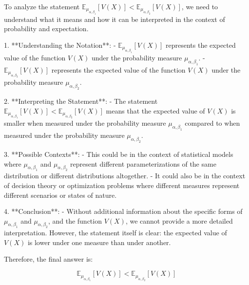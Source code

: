 To analyze the statement \(\mathbb{E}_{\mu_{\alpha, \beta_1}} [V(X)] < \mathbb{E}_{\mu_{\alpha, \beta_2}} [V(X)]\), we need to understand what it means and how it can be interpreted in the context of probability and expectation.

1. **Understanding the Notation**:
   - \(\mathbb{E}_{\mu_{\alpha, \beta_1}} [V(X)]\) represents the expected value of the function \(V(X)\) under the probability measure \(\mu_{\alpha, \beta_1}\).
   - \(\mathbb{E}_{\mu_{\alpha, \beta_2}} [V(X)]\) represents the expected value of the function \(V(X)\) under the probability measure \(\mu_{\alpha, \beta_2}\).

2. **Interpreting the Statement**:
   - The statement \(\mathbb{E}_{\mu_{\alpha, \beta_1}} [V(X)] < \mathbb{E}_{\mu_{\alpha, \beta_2}} [V(X)]\) means that the expected value of \(V(X)\) is smaller when measured under the probability measure \(\mu_{\alpha, \beta_1}\) compared to when measured under the probability measure \(\mu_{\alpha, \beta_2}\).

3. **Possible Contexts**:
   - This could be in the context of statistical models where \(\mu_{\alpha, \beta_1}\) and \(\mu_{\alpha, \beta_2}\) represent different parameterizations of the same distribution or different distributions altogether.
   - It could also be in the context of decision theory or optimization problems where different measures represent different scenarios or states of nature.

4. **Conclusion**:
   - Without additional information about the specific forms of \(\mu_{\alpha, \beta_1}\) and \(\mu_{\alpha, \beta_2}\), and the function \(V(X)\), we cannot provide a more detailed interpretation. However, the statement itself is clear: the expected value of \(V(X)\) is lower under one measure than under another.

Therefore, the final answer is:

\[
\boxed{\mathbb{E}_{\mu_{\alpha, \beta_1}} [V(X)] < \mathbb{E}_{\mu_{\alpha, \beta_2}} [V(X)]}
\]
